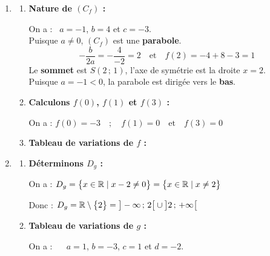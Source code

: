 \documentclass[10pt, a4paper]{article}
\begin{document}
\begin{Solution}
\begin{enumerate}[leftmargin=*,itemsep=0.5pt]
    \item
    \begin{enumerate}[leftmargin=*,itemsep=0.5pt]
        \item \textbf{Nature de $(C_f)$ :}

        On a :~ $a = -1$, $b = 4$ et $c = -3$. \\
        Puisque $a \neq 0$, $(C_f)$ est une \textbf{parabole}.
        \[ -\frac{b}{2a} = -\frac{4}{-2} = 2 \quad \text{et} \quad f(2) = -4 + 8 - 3 = 1 \]
        Le \textbf{sommet} est $S(2\,;\,1)$, l'axe de symétrie est la droite $x = 2$. \\
        Puisque $a = -1 < 0$, la parabole est dirigée vers le \textbf{bas}.

        \item \textbf{Calculons $f(0)$, $f(1)$ et $f(3)$ :}

         On a : \quad $f(0) = -3 \quad;\quad f(1) = 0 \quad \text{et} \quad f(3)  = 0 $

        \item \textbf{Tableau de variations de $f$ :}

        \begin{center}
        \end{center}
    \end{enumerate}

    \item
    \begin{enumerate}[leftmargin=*,itemsep=0.5pt]
        \item \textbf{Déterminons $D_g$ :}

         On a : \quad   $D_g = \big\{ x \in \mathbb{R} \mid x - 2 \neq 0 \big\} = \big\{ x \in \mathbb{R} \mid x \neq 2 \big\}$
         
        Donc : \quad $D_g = \mathbb{R} \setminus \big\{2\big\} = \big]-\infty\,;\,2\big[ \cup \big]2\,;\,+\infty\big[$

        \item \textbf{Tableau de variations de $g$ :}

        On a : ~~ $a = 1$, $b = -3$, $c = 1$ et $d = -2$.


\end{enumerate}
\end{enumerate}
\end{Solution}
\end{document}
